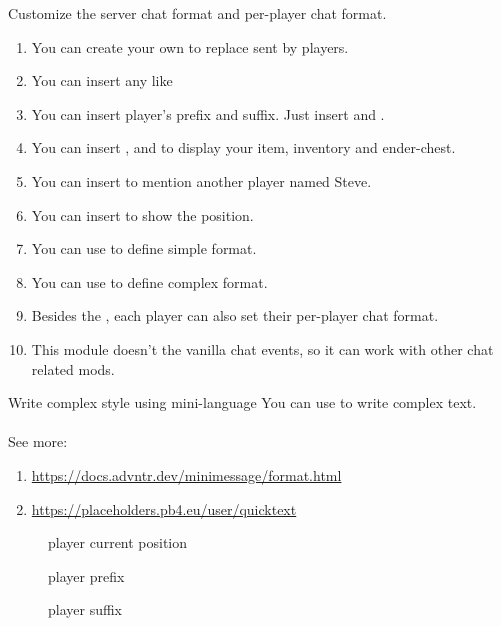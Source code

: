 Customize the server chat format and per-player chat format.


\begin{enumerate}
    \item You can create your own  to replace  sent by players.
    \item You can insert any  like 
    \item {You can insert player's prefix and suffix. Just insert  and .}
    \item You can insert ,  and  to display your item, inventory and ender-chest.
    \item You can insert  to mention another player named Steve.
    \item You can insert  to show the position.
    \item You can use  to define simple format.
    \item You can use  to define complex format.
    \item Besides the , each player can also set their per-player chat format.
    \item This module doesn't  the vanilla chat events, so it can work with other chat related mods.
\end{enumerate}

\begin{tips}{Write complex style using mini-language}
    You can use  to write complex text.\\
    \\
    See more:
    \begin{enumerate}
        \item \url{https://docs.advntr.dev/minimessage/format.html}
        \item \url{https://placeholders.pb4.eu/user/quicktext}
    \end{enumerate}
\end{tips}

\begin{description}
    \item[] player current position
    \item[] player prefix
    \item[] player suffix
\end{description}

